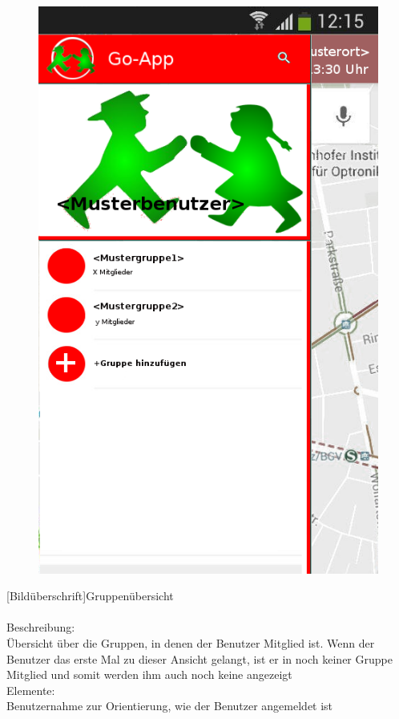 \begin{figure}
	\includegraphics[scale =1]{resources/images/gruppenuebersicht.png}
\end{figure}
[Bildüberschrift]Gruppenübersicht\\ \\
[Kleinüberschrift]Beschreibung:\\
Übersicht über die Gruppen, in denen der Benutzer Mitglied ist. Wenn der Benutzer das erste Mal zu dieser Ansicht gelangt, ist er in noch keiner Gruppe Mitglied und somit werden ihm auch noch keine angezeigt\\
[Kleinüberschrift]Elemente:\\
Benutzernahme zur Orientierung, wie der Benutzer angemeldet ist\\
